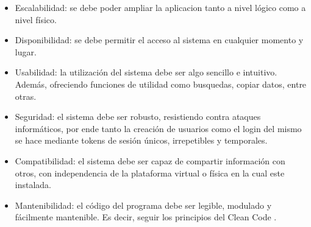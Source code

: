 \begin{itemize}
    \item Escalabilidad: se debe poder ampliar la aplicacion tanto a nivel lógico como a nivel físico.
    \item Disponibilidad: se debe permitir el acceso al sistema en cualquier momento y lugar.
    \item Usabilidad: la utilización del sistema debe ser algo sencillo e intuitivo. Además, ofreciendo funciones de utilidad como busquedas, copiar datos, entre otras.
    \item Seguridad: el sistema debe ser robusto, resistiendo contra ataques informáticos, por ende tanto la creación de usuarios como el login del mismo se hace mediante tokens de sesión únicos, irrepetibles y temporales.
    \item Compatibilidad: el sistema debe ser capaz de compartir información con otros, con independencia de la plataforma virtual o física en la cual este instalada.
    \item Mantenibilidad: el código del programa debe ser legible, modulado y fácilmente mantenible. Es decir, seguir los principios del Clean Code \cite{cleancode}.
\end{itemize}